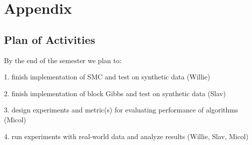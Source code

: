 \documentclass{article}
\begin{document}
\section{Appendix}
\subsection{Plan of Activities}

By the end of the semester we plan to:

1. finish implementation of SMC and test on synthetic data (Willie)

2. finish implementation of block Gibbs and test on synthetic data (Slav)

3. design experiments and metric(s) for evaluating performance of algorithms (Micol)

4. run experiments with real-world data and analyze results (Willie, Slav, Micol)


\begin{small}

 

\end{small}
\end{document}
